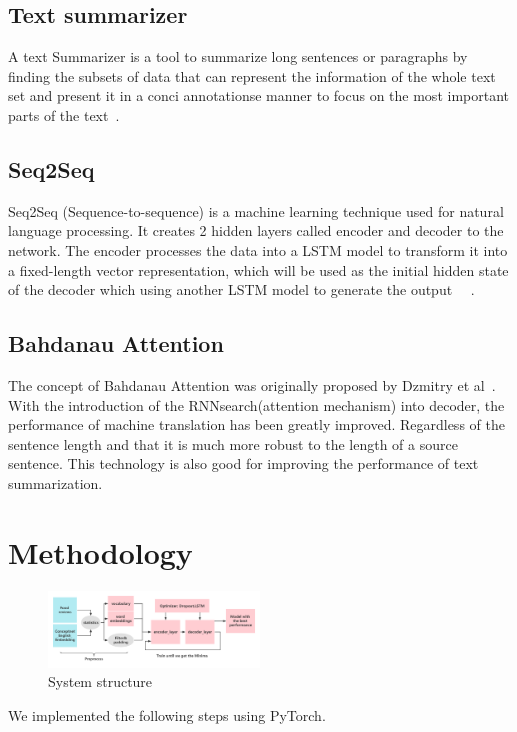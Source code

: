 \documentclass[conference]{IEEEtran}
\begin{document}
\subsection{Text summarizer}
A text Summarizer is a tool to summarize long sentences or paragraphs by finding the subsets of data that can represent the information of the whole text set and present it in a conci annotationse manner to focus on the most important parts of the text~\cite{sinha2018extractive}. 
\subsection{Seq2Seq}
Seq2Seq (Sequence-to-sequence) is a machine learning technique used for natural language processing. It creates 2 hidden layers called encoder and decoder to the network. The encoder processes the data into a LSTM model to transform it into a fixed-length vector representation, which will be used as the initial hidden state of the decoder which using another LSTM model to generate the output ~\cite{sutskever2014sequence}~\cite{vinyals2015show}. 
\subsection{Bahdanau Attention}
The concept of Bahdanau Attention was originally proposed by Dzmitry et al~\cite{bahdanau2014neural}. With the introduction of the RNNsearch(attention mechanism) into decoder, the performance of machine translation has been greatly improved. Regardless of the sentence length and that it is much more robust to the length of a source sentence. This technology is also good for improving the performance of text summarization. 

\section{Methodology}
\begin{figure}[h]
\centering
\includegraphics[width=0.5\textwidth]{imgs/System_Structure.png}
\caption{System structure}
\label{fig:System_Structure}
\end{figure}
\begin{flushleft}
We implemented the following steps using PyTorch.
\end{flushleft}
\end{document}
